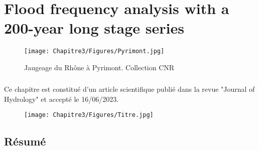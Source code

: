 \chapter{Flood frequency analysis with a 200-year long stage series}
\label{chap:ch3}

\begin{figure}[h]
	\centering
		\texttt{[image: Chapitre3/Figures/Pyrimont.jpg]}
        \caption{Jaugeage du Rhône à Pyrimont. Collection CNR}	
\end{figure}


\newpage
\FloatBarrier
\paragraph{} Ce chapitre est constitué d'un article scientifique publié dans la revue "Journal of Hydrology" et accepté le 16/06/2023.


\begin{figure}[h!]
    \centering
        \texttt{[image: Chapitre3/Figures/Titre.jpg]}
\end{figure}
\FloatBarrier

\section{Résumé}

